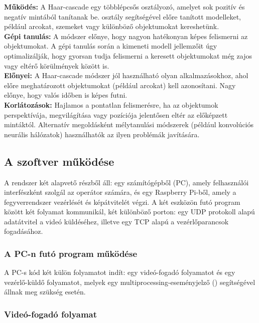 \documentclass[12pt,a4paper]{article}
\newcommand{\code}[1]{\tcbox{\texttt{#1}}}
\begin{document}
\textbf{Működés:} A Haar-cascade egy többlépcsős osztályozó, amelyet sok pozitív és negatív mintából tanítanak be. \code{A cv2.CascadeClassifier()} osztály segítségével előre tanított modelleket, például arcokat, szemeket vagy különböző objektumokat kereshetünk.\\

\textbf{Gépi tanulás:} A módszer előnye, hogy nagyon hatékonyan képes felismerni az objektumokat. A gépi tanulás során a kimeneti modell jellemzőit úgy optimalizálják, hogy gyorsan tudja felismerni a keresett objektumokat még zajos vagy eltérő körülmények között is.\\

\textbf{Előnyei:} A Haar-cascade módszer jól használható olyan alkalmazásokhoz, ahol előre meghatározott objektumokat (például arcokat) kell azonosítani. Nagy előnye, hogy valós időben is képes futni.\\

\textbf{Korlátozások:} Hajlamos a pontatlan felismerésre, ha az objektumok perspektívája, megvilágítása vagy pozíciója jelentősen eltér az előképzett mintáktól. Alternatív megoldásként mélytanulási módszerek (például konvolúciós neurális hálózatok) használhatók az ilyen problémák javítására. \pagebreak



\subsection{A szoftver működése}
A rendszer két alapvető részből áll: egy számítógépből (PC), amely felhasználói interfészként szolgál az operátor számára, és egy Raspberry Pi-ből, amely a fegyverrendszer vezérlését és képátvitelét végzi. A két eszközön futó program között két folyamat kommunikál, két különböző porton: egy UDP protokoll alapú adatátvitel a videó küldéséhez, illetve egy TCP alapú a vezérlőparancsok fogadásához. \\

\subsubsection{A PC-n futó program működése}
A PC-s kód két külön folyamatot indít: egy videó-fogadó folyamatot és egy vezérlő-küldő folyamatot, melyek egy multiprocessing-eseményjelző (\code{stop\textunderscore event}) segítségével állnak meg szükség esetén.

\subsubsection*{Videó-fogadó folyamat}
\end{document}
